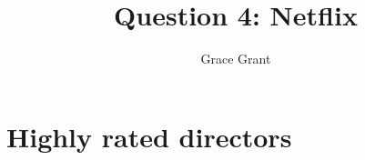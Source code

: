 \documentclass[11pt,preprint, authoryear]{elsarticle}
\numberwithin{equation}{section}
\numberwithin{figure}{section}
\numberwithin{table}{section}
\begin{document}
\begin{frontmatter}  %

\title{Question 4: Netflix}





\author[Add1]{Grace Grant}





\address[Add1]{Stellenbosch University, Stellenbosch, South Africa}



\vspace{1cm}





\vspace{0.5cm}

\end{frontmatter}

\setcounter{footnote}{0}



\pagestyle{fancy}
\chead{}
\rhead{}
\lfoot{}
\lhead{}
\cfoot{}


\headsep 35pt %




\hypertarget{highly-rated-directors}{%
\section{Highly rated directors}\label{highly-rated-directors}}
\end{document}

